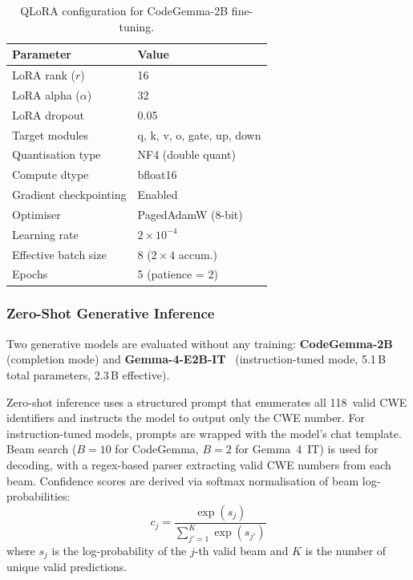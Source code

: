 \begin{table}[t]
\centering
\caption{QLoRA configuration for CodeGemma-2B fine-tuning.}
\label{tab:qlora_config}
\begin{tabular}{ll}
\hline
\textbf{Parameter}        & \textbf{Value} \\
\hline
LoRA rank ($r$)            & 16 \\
LoRA alpha ($\alpha$)      & 32 \\
LoRA dropout               & 0.05 \\
Target modules             & q, k, v, o, gate, up, down \\
Quantisation type          & NF4 (double quant) \\
Compute dtype              & bfloat16 \\
Gradient checkpointing     & Enabled \\
Optimiser                  & PagedAdamW (8-bit) \\
Learning rate              & $2 \times 10^{-4}$ \\
Effective batch size       & 8 ($2 \times 4$ accum.) \\
Epochs                     & 5 (patience = 2) \\
\hline
\end{tabular}
\end{table}

\subsubsection{Zero-Shot Generative Inference}
Two generative models are evaluated without any training:
\textbf{CodeGemma-2B}~\cite{team2024codegemma} (completion mode) and
\textbf{Gemma-4-E2B-IT}~\cite{team2024gemma} (instruction-tuned mode, 5.1\,B
total parameters, 2.3\,B effective).

Zero-shot inference uses a structured prompt that enumerates all 118~valid
CWE identifiers and instructs the model to output only the CWE number.
For instruction-tuned models, prompts are wrapped with the model's chat
template.  Beam search ($B = 10$ for CodeGemma, $B = 2$ for Gemma~4~IT) is
used for decoding, with a regex-based parser extracting valid CWE numbers
from each beam.  Confidence scores are derived via softmax normalisation
of beam log-probabilities:
\begin{equation}
    c_j = \frac{\exp(s_j)}{\sum_{j'=1}^{K} \exp(s_{j'})}
\label{eq:beam_confidence}
\end{equation}
where $s_j$ is the log-probability of the $j$-th valid beam and $K$ is the
number of unique valid predictions.

